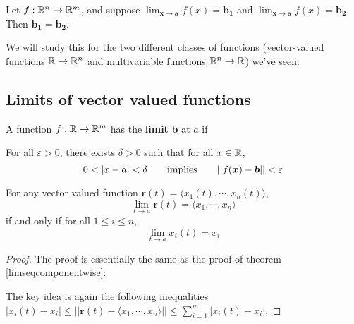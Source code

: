     \begin{proposition}
    Let $f: \mathbb{R}^n \to \mathbb{R}^m$, and suppose $\lim_{\bm{x} \to \bm{a}}f(x) = \bm{b_1}$ and $\lim_{\bm{x} \to \bm{a}}f(x) = \bm{b_2}$.  Then $\bm{b_1} = \bm{b_2}$.
    \end{proposition}

We will study this for the two different classes of functions (\hyperref[limvectorval]{vector-valued functions} $\mathbb{R} \to \mathbb{R}^n$ and \hyperref[limmulti]{multivariable functions} $\mathbb{R}^n \to \mathbb{R}$)  we've seen.














\subsection{Limits of vector valued functions}\label{limvectorval}

\begin{definition}
    A function $f : \mathbb{R} \to \mathbb{R}^m$ has the \textbf{limit} $\bm{b}$ at $a$ if
    
    \vspace{1em}
    For all $\varepsilon>0$, there exists $\delta > 0$ such that for all $x \in \mathbb{R}$, $$0 < |x-a| < \delta \qquad \textnormal{implies} \qquad ||f(\bm{x}) - \bm{b} || < \varepsilon$$
    
    \end{definition}


\begin{theorem}
    For any vector valued function $\bm{r}(t) = \langle x_1(t), \cdots, x_n(t) \rangle$, $$\lim_{t \to a} \bm{r}(t) = \langle x_1, \cdots, x_n \rangle$$ if and only if for all $1 \leq i \leq n$, $$\lim_{t \to a} x_i(t) = x_i$$
    
    
    \end{theorem}

    \begin{proof}
    The proof is essentially the same as the proof of theorem \ref{limseqcomponentwise}:
    
    The key idea is again the following inequalities $|x_i(t) - x_i| \leq ||\bm{r}(t) - \langle x_1, \cdots, x_n \rangle|| \leq \sum_{i=1}^m |x_i(t) - x_i|$.
    
    
    
    \end{proof}

